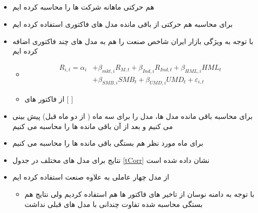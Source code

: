 \documentclass[12pt, a4paper]{article}
\begin{document}
\subsection{}
\label{comovement}
\begin{itemize}
	\item
	هم حرکتی ماهانه شرکت ها را محاسبه کرده ایم
	\item
	برای محاسبه هم حرکتی از باقی مانده مدل های فاکتوری استفاده کرده ایم
	\item
	با توجه به ویژگی بازار ایران شاخص صنعت را هم به مدل های چند فاکتوری اضافه کرده ایم

\begin{itemize}
	\item 
		\begin{equation}
		\begin{split}
			R_{i,t} =\alpha _{i}&+\beta _{mkt,i}{\mathit {R}}_{M,t} + \beta_{Ind,i}{\mathit {R}}_{Ind,t}+\beta _{HML,i}{\mathit {HML}}_{t} \\
			&+\beta _{SMB,i}{\mathit {SMB}}_{t}+\beta _{UMD,i}{\mathit {UMD}}_{t}+ \varepsilon_{i,t}
		\end{split}
		\label{e5Factor}
	\end{equation}
	\item
	از فاکتور های  [
	]
\end{itemize}
	
	\item
	برای محاسبه باقی مانده مدل ها، مدل را برای سه ماه ( از دو ماه قبل) پیش بینی می کنیم و بعد از آن باقی مانده ها را محاسبه می کنیم
	\item
	برای ماه مورد نظر هم بستگی باقی مانده ها را محاسبه می کنیم
	\item
	نتایج برای مدل های مختلف  در جدول
	\ref{tCorr}
	نشان داده شده است
	\item
	از مدل چهار عاملی به علاوه صنعت استفاده کرده ایم
	\begin{itemize}
		\item 
		با توجه به دامنه نوسان از تاخیر های فاکتور ها هم استفاده کردیم ولی نتایج  هم بستگی محاسبه شده تفاوت چندانی با مدل های قبلی نداشت
	\end{itemize}
	
\end{itemize}

     
\begin{LTR}
\end{LTR}
      
\end{document}
